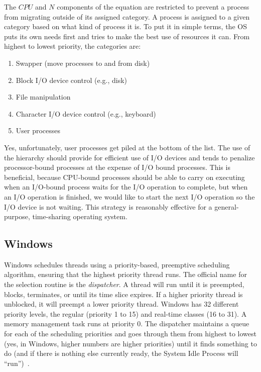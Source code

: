 The $CPU$ and $N$ components of the equation are restricted to prevent a process from migrating outside of its assigned category. A process is assigned to a given category based on what kind of process it is. To put it in simple terms, the OS puts its own needs first and tries to make the best use of resources it can. From highest to lowest priority, the categories are:

\begin{enumerate}
	\item Swapper (move processes to and from disk)
	\item Block I/O device control (e.g., disk)
	\item File manipulation
	\item Character I/O device control (e.g., keyboard)
	\item User processes
\end{enumerate}

Yes, unfortunately, user processes get piled at the bottom of the list. The use of the hierarchy should provide for efficient use of I/O devices and tends to penalize processor-bound processes at the expense of I/O bound processes. This is beneficial, because CPU-bound processes should be able to carry on executing when an I/O-bound process waits for the I/O operation to complete, but when an I/O operation is finished, we would like to start the next I/O operation so the I/O device is not waiting. This strategy is reasonably effective for a general-purpose, time-sharing operating system.

\subsection*{Windows}

Windows schedules threads using a priority-based, preemptive scheduling algorithm, ensuring that the highest priority thread runs. The official name for the selection routine is the \textit{dispatcher}. A thread will run until it is preempted, blocks, terminates, or until its time slice expires. If a higher priority thread is unblocked, it will preempt a lower priority thread. Windows has 32 different priority levels, the regular (priority 1 to 15) and real-time classes (16 to 31). A memory management task runs at priority 0. The dispatcher maintains a queue for each of the scheduling priorities and goes through them from highest to lowest (yes, in Windows, higher numbers are higher priorities) until it finds something to do (and if there is nothing else currently ready, the System Idle Process will ``run'')~\cite{osc}.

